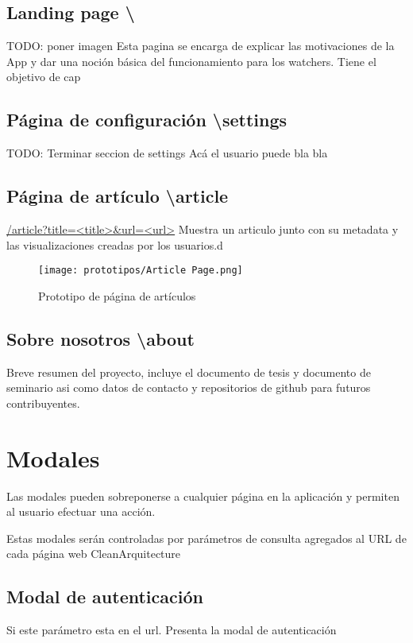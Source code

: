 \subsection{Landing page \textbackslash}
TODO: poner imagen
Esta pagina se encarga de explicar las motivaciones de la App y dar una noción básica del funcionamiento para los watchers.
Tiene el objetivo de cap

\subsection{Página de configuración \textbackslash settings}
TODO: Terminar seccion de settings
Acá el usuario puede bla bla

\subsection{Página de artículo \textbackslash article}
\url{/article?title=<title>&url=<url>}
Muestra un articulo junto con su metadata y las visualizaciones creadas por los usuarios.d

\begin{figure}[H]
    \centering
    \texttt{[image: prototipos/Article Page.png]}
    \caption{Prototipo de página de artículos}
    \label{PrototipoSettingsPage}
\end{figure}

\subsection{Sobre nosotros \textbackslash about}
Breve resumen del proyecto, incluye el documento de tesis y documento de seminario asi como datos de contacto y repositorios de github para futuros contribuyentes.

\section{Modales}
Las modales pueden sobreponerse a cualquier página en la aplicación y permiten al usuario efectuar una acción.

Estas modales serán controladas por parámetros de consulta agregados al URL de cada página web
CleanArquitecture
\subsection{Modal de autenticación}

Si este parámetro esta en el url. Presenta la modal de autenticación

